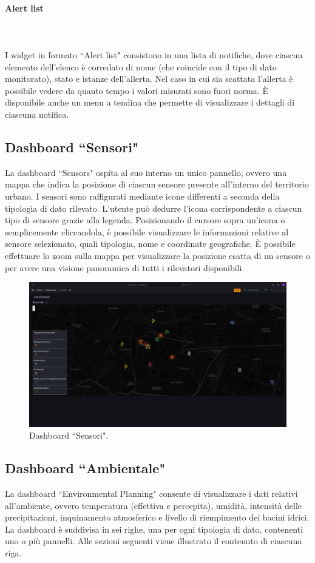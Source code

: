 \documentclass[8pt]{article}
\newcommand{\subsubsubsection}[1]{\paragraph{#1}\mbox{}\\\\}
\begin{document}
\subsubsubsection{Alert list}
I widget in formato ``Alert list" consistono in una lista di notifiche, dove ciascun elemento dell'elenco è corredato di nome (che coincide con il tipo di dato monitorato), stato e istanze dell'allerta. Nel caso in cui sia scattata l'allerta è possibile vedere da quanto tempo i valori misurati sono fuori norma. È disponibile anche un menu a tendina che permette di visualizzare i dettagli di ciascuna notifica.

\subsection{Dashboard ``Sensori"}
La dashboard ``Sensors" ospita al suo interno un unico pannello, ovvero una mappa che indica la posizione di ciascun sensore presente all'interno del territorio urbano. I sensori sono raffigurati mediante icone differenti a seconda della tipologia di dato rilevato. L'utente può dedurre l'icona corrispondente a ciascun tipo di sensore grazie alla legenda. Posizionando il cursore sopra un'icona o semplicemente cliccandola, è possibile visualizzare le informazioni relative al sensore selezionato, quali tipologia, nome e coordinate geografiche. È possibile effettuare lo zoom sulla mappa per visualizzare la posizione esatta di un sensore o per avere una visione panoramica di tutti i rilevatori disponibili.
\begin{figure}[H]
    \centering
    \includegraphics[width=15cm]{images_mu/sensors.png}
    \caption{Dashboard ``Sensori".}
    \label{fig:Dashboard ``Sensori"}
\end{figure}
\subsection{Dashboard ``Ambientale"}
La dashboard ``Environmental Planning" consente di visualizzare i dati relativi all'ambiente, ovvero temperatura (effettiva e percepita), umidità, intensità delle precipitazioni, inquinamento atmosferico e livello di riempimento dei bacini idrici. La dashboard è suddivisa in sei righe, una per ogni tipologia di dato, contenenti uno o più pannelli. Alle sezioni seguenti viene illustrato il contenuto di ciascuna riga.
\end{document}
